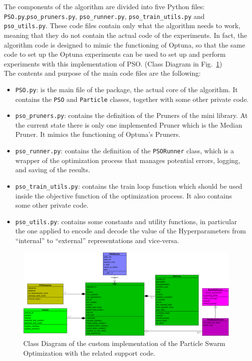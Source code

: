 The components of the algorithm are divided into five Python files: \texttt{PSO.py},\newline\texttt{pso\_pruners.py}, \texttt{pso\_runner.py}, \texttt{pso\_train\_utils.py} and \texttt{pso\_utils.py}.
These code files contain only what the algorithm needs to work, meaning that they do not contain the actual code of the experiments. In fact, the algorithm code is designed to mimic the functioning of Optuna, so that the same code to set up the Optuna experiments can be used to set up and perform experiments with this implementation of PSO. (Class Diagram in Fig.~\ref{fig:figure-3.2.1})
% 
\\[0.3cm]The contents and purpose of the main code files are the following:
\begin{itemize}[itemsep=0.1cm]
    \item \texttt{PSO.py}: is the main file of the package, the actual core of the algorithm. It contains the \texttt{PSO} and \texttt{Particle} classes, together with some other private code.
    \item \texttt{pso\_pruners.py}: contains the definition of the Pruners of the mini library. At the current state there is only one implemented Pruner which is the Median Pruner. It mimics the functioning of Optuna's Pruners.
    \item \texttt{pso\_runner.py}: contains the definition of the \texttt{PSORunner} class, which is a wrapper of the optimization process that manages potential errors, logging, and saving of the results.
    \item \texttt{pso\_train\_utils.py}: contains the train loop function which should be used inside the objective function of the optimization process. It also contains some other private code.
    \item \texttt{pso\_utils.py}: contains some constants and utility functions, in particular the one applied to encode and decode the value of the Hyperparameters from “internal” to “external” representations and vice-versa.
\end{itemize}
\begin{figure}[t]
	\centering
	\includegraphics[width=15cm]{figures/figure-3.2.1.png}
	\caption[Class Diagram of Custom PSO Implementation]{Class Diagram of the custom implementation of the Particle Swarm Optimization with the related support code.}
	\label{fig:figure-3.2.1}
\end{figure}

